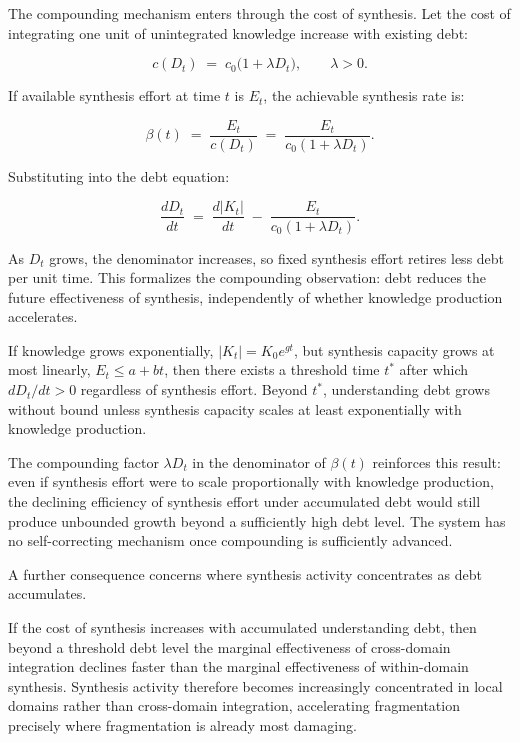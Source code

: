 The compounding mechanism enters through the cost of synthesis. Let the cost
of integrating one unit of unintegrated knowledge increase with existing debt:

\[
c(D_t) \;=\; c_0\bigl(1 + \lambda D_t\bigr), \qquad \lambda > 0.
\]

If available synthesis effort at time $t$ is $E_t$, the achievable synthesis
rate is:

\[
\beta(t) \;=\; \frac{E_t}{c(D_t)} \;=\; \frac{E_t}{c_0(1 + \lambda D_t)}.
\]

Substituting into the debt equation:

\[
\frac{dD_t}{dt}
\;=\;
\frac{d|K_t|}{dt}
\;-\;
\frac{E_t}{c_0(1+\lambda D_t)}.
\]

As $D_t$ grows, the denominator increases, so fixed synthesis effort retires
less debt per unit time. This formalizes the compounding observation: debt
reduces the future effectiveness of synthesis, independently of whether
knowledge production accelerates.

\begin{proposition}
If knowledge grows exponentially, $|K_t| = K_0 e^{gt}$, but synthesis
capacity grows at most linearly, $E_t \leq a + bt$, then there exists a
threshold time $t^*$ after which $dD_t/dt > 0$ regardless of synthesis
effort. Beyond $t^*$, understanding debt grows without bound unless synthesis
capacity scales at least exponentially with knowledge production.
\end{proposition}

The compounding factor $\lambda D_t$ in the denominator of $\beta(t)$
reinforces this result: even if synthesis effort were to scale proportionally
with knowledge production, the declining efficiency of synthesis effort under
accumulated debt would still produce unbounded growth beyond a sufficiently
high debt level. The system has no self-correcting mechanism once compounding
is sufficiently advanced.

A further consequence concerns where synthesis activity concentrates as debt
accumulates.

\begin{proposition}
If the cost of synthesis increases with accumulated understanding debt, then
beyond a threshold debt level the marginal effectiveness of cross-domain
integration declines faster than the marginal effectiveness of within-domain
synthesis. Synthesis activity therefore becomes increasingly concentrated in
local domains rather than cross-domain integration, accelerating fragmentation
precisely where fragmentation is already most damaging.
\end{proposition}

